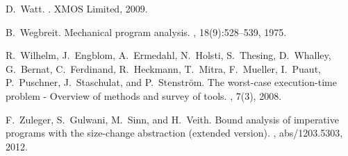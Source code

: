 \documentclass{llncs}
\begin{document}
\begin{thebibliography}{10}
D.~Watt.
.
\newblock XMOS Limited, 2009.

B.~Wegbreit.
\newblock Mechanical program analysis.
, 18(9):528--539, 1975.

R.~Wilhelm, J.~Engblom, A.~Ermedahl, N.~Holsti, S.~Thesing, D.~Whalley,
  G.~Bernat, C.~Ferdinand, R.~Heckmann, T.~Mitra, F.~Mueller, I.~Puaut,
  P.~Puschner, J.~Staschulat, and P.~Stenstr{\"o}m.
\newblock The worst-case execution-time problem - {O}verview of methods and
  survey of tools.
, 7(3), 2008.

F.~Zuleger, S.~Gulwani, M.~Sinn, and H.~Veith.
\newblock Bound analysis of imperative programs with the size-change
  abstraction (extended version).
, abs/1203.5303, 2012.

\end{thebibliography}
\end{document}
